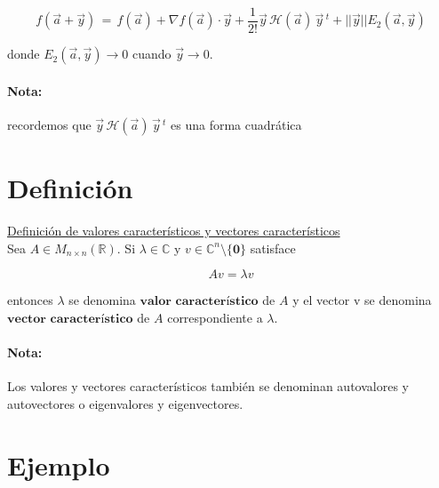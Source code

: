 \documentclass[12pt]{article}
\newcommand{\definicion}{\section{Definición}}
\newcommand{\ejemplo}{\section{Ejemplo}}
\begin{document}
	$$ f(\vec{a} + \vec{y}) \, = \, f(\vec{a}) + \nabla f(\vec{a}) \cdot \vec{y} + \dfrac{1}{2!} \vec{y} \,  \mathscr{H}(\vec{a})\, \vec{y} \, ^{t} + || \vec{y} || E_{2}(\vec{a}, \vec{y})$$
	
	donde $E_{2}(\vec{a}, \vec{y}) \rightarrow 0$ cuando $\vec{y} \rightarrow 0$.
	
	\paragraph{Nota:} recordemos que $\vec{y} \, \mathscr{H}(\vec{a})\,\vec{y} \, ^{t}$ es una forma cuadrática
	
	
	\definicion
	
	\underline{Definición de valores característicos y vectores característicos} \\
	
	Sea $ A \in M_{n \times n} (\mathbb{R}).$ Si $\lambda \in \mathbb{C}$ y $v \in \mathbb{C}^{n}  \setminus \{ \textbf{0} \}$ satisface 
	
	\begin{equation}
	    A v = \lambda v
    \end{equation}
    
    entonces $\lambda$ se denomina $\textbf{valor característico}$ de $A$ y el vector v se denomina $\textbf{vector característico}$ de $A$ correspondiente a $\lambda$.
    
    \paragraph{Nota:} Los valores y vectores característicos también se denominan autovalores y autovectores o eigenvalores y eigenvectores.
    
    \pagebreak
    
    \ejemplo
    
\end{document}
